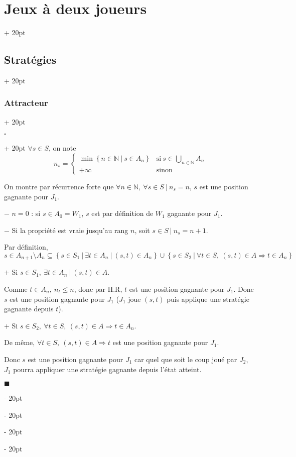 \documentclass[a4paper, 12pt, twoside]{article}
\newcommand{\N}{\mathbb{N}} %
\newcommand{\set}[1]{\left\{ #1 \right\}}
\renewcommand{\le}{\leqslant}
\newcommand{\ind}[1][20pt]{\advance\leftskip + #1}
\newcommand{\deind}[1][20pt]{\advance\leftskip - #1}
\newenvironment{indt}[2][20pt]{#2 \par \ind[#1]}{\par \deind} %
\newenvironment{proof}[1][{}]{\begin{indt}{$\square$ #1}}{$\blacksquare$ \end{indt}}
\begin{document}
\begin{indt}{\section{Jeux à deux joueurs}}
\begin{indt}{\subsection{Stratégies}}
\begin{indt}{\subsubsection{Attracteur}}
                \vspace{6pt}
                
                \begin{proof}
                    $\forall s \in S$, on note
                    \[
                        n_s =
                        \begin{cases}
                            \min\set{n \in \N\ |\ s \in A_n}
                            & \displaystyle \text{si}\ s \in \bigcup_{n \in \N} A_n
                            \\
                            +\infty
                            & \text{sinon}
                        \end{cases}
                    \]

                    On montre par récurrence forte que $\forall n \in \N,\ \forall s \in S\ |\ n_s = n$, $s$ est une position gagnante pour $J_1$.

                    $-$ $n = 0$ : si $s \in A_0 = W_1$, $s$ est par définition de $W_1$ gagnante pour $J_1$.

                    $-$ Si la propriété est vraie jusqu'au rang $n$, soit $s \in S\ |\ n_s = n + 1$.

                    Par définition,
                    \[
                        s \in A_{n + 1} \setminus A_n
                        \subseteq \set{s \in S_1\ |\ \exists t \in A_n\ |\ (s, t) \in A_n}
                        \cup \set{s \in S_2\ |\ \forall t \in S,\ (s, t) \in A \Rightarrow t \in A_n}
                    \]

                    $+$ Si $s \in S_1,\ \exists t \in A_n\ |\ (s, t) \in A$.

                    Comme $t \in A_n,\ n_t \le n$, donc par H.R, $t$ est une position gagnante pour $J_1$.
                    Donc $s$ est une position gagnante pour $J_1$ ($J_1$ joue $(s, t)$ puis applique une stratégie gagnante depuis $t$).

                    $+$ Si $s \in S_2,\ \forall t \in S,\ (s, t) \in A \Rightarrow t \in A_n$.

                    De même, $\forall t \in S,\ (s, t) \in A \Rightarrow t$ est une position gagnante pour $J_1$.

                    Donc $s$ est une position gagnante pour $J_1$ car quel que soit le coup joué par $J_2$, $J_1$ pourra appliquer une stratégie gagnante depuis l'état atteint.

                    \vspace{6pt}
                    

\end{proof}
\end{indt}
\end{indt}
\end{indt}
\end{document}
